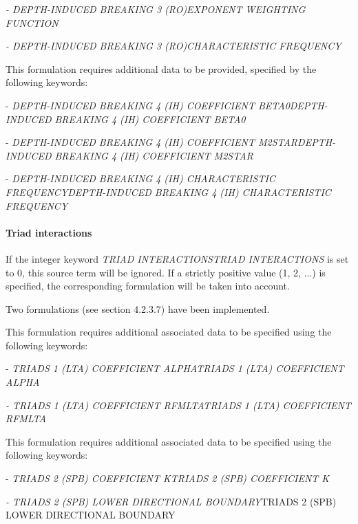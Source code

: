  \textit{- DEPTH-INDUCED BREAKING 3 (RO)EXPONENT WEIGHTING FUNCTION}

 \textit{- DEPTH-INDUCED BREAKING 3 (RO)CHARACTERISTIC FREQUENCY}

 \textbf{\underbar{}}

 \textbf{}

 This formulation requires additional data to be provided, specified by the following keywords:

 - \textit{DEPTH-INDUCED BREAKING 4 (IH) COEFFICIENT BETA0DEPTH-INDUCED BREAKING 4 (IH) COEFFICIENT BETA0}

 - \textit{DEPTH-INDUCED BREAKING 4 (IH) COEFFICIENT M2STARDEPTH-INDUCED BREAKING 4 (IH) COEFFICIENT M2STAR}

 - \textit{DEPTH-INDUCED BREAKING 4 (IH) CHARACTERISTIC FREQUENCYDEPTH-INDUCED BREAKING 4 (IH) CHARACTERISTIC FREQUENCY}




\paragraph{ Triad interactions}

 If the integer keyword \textit{TRIAD INTERACTIONSTRIAD INTERACTIONS} is set to 0, this source term will be ignored. If a strictly positive value (1, 2, ...) is specified, the corresponding formulation will be taken into account.

 Two formulations (see section 4.2.3.7) have been implemented.

 \textbf{}

 This formulation requires additional associated data to be specified using the following keywords:

 - \textit{TRIADS 1 (LTA) COEFFICIENT ALPHATRIADS 1 (LTA) COEFFICIENT ALPHA }

 \textit{- TRIADS 1 (LTA) COEFFICIENT RFMLTATRIADS 1 (LTA) COEFFICIENT RFMLTA }

 \textbf{\underbar{}}

 \textbf{}

 This formulation requires additional associated data to be specified using the following keywords:

 - \textit{TRIADS 2 (SPB) COEFFICIENT KTRIADS 2 (SPB) COEFFICIENT K}

 \textit{- TRIADS 2 (SPB) LOWER DIRECTIONAL BOUNDARY}TRIADS 2 (SPB) LOWER DIRECTIONAL BOUNDARY\textit{}

